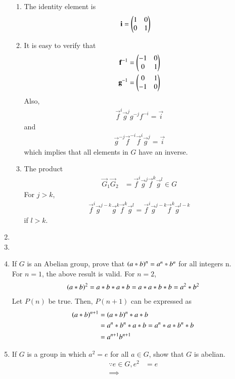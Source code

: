 \begin{enumerate}[label=\arabic*.,ref=\thesubsection.\theenumi]
\begin{enumerate}
	\item The identity element is 
\begin{align}
	\mathbf{i} &= 	\begin{pmatrix}1 & 0\\0 & 1\end{pmatrix}
\end{align}
	\item It is easy to verify that 
\begin{align}
	\mathbf{f}^{-1} &= 	\begin{pmatrix}-1 & 0\\0 & 1\end{pmatrix}
		\\
	\mathbf{g}^{-1} &= 
	\begin{pmatrix}0  & 1\\-1 & 0\end{pmatrix}
\end{align}
Also, 
\begin{align}
	\vec{f}^{i}
	\vec{g}^{j}g^{-j}f^{-i} =\vec{i} 
\end{align}
and 
\begin{align}
	\vec{g}^{-j}\vec{f}^{-i}	\vec{f}^{i}
	\vec{g}^{j} =\vec{i} 
\end{align}
which implies that all elements in $G$ have an inverse.
	\item The product
\begin{align}
	\vec{G}_1 	\vec{G}_2&= \vec{f}^i\vec{g}^j 
  \vec{f}^k\vec{g}^l \in G
\end{align}
For $j > k$,
\begin{align}
	\vec{f}^i\vec{g}^{j-k} \vec{g}^{k}
  \vec{f}^k\vec{g}^l  = 
	\vec{f}^i\vec{g}^{j-k} \vec{f}^{k}
	\vec{g}^{l-k}
\end{align}
if $l > k$.
\end{enumerate}
\item 
\item 
\item If $G$ is an Abelian group, prove that $\left(a*b\right)^n = a^n * b^n$ for all integers n.
	\\
	\solution For $n = 1$, the above result is valid.  For $n = 2$, 
\begin{align}
	\left(a*b\right)^2 = a*b*a*b = a*a*b*b = a^2*b^2
\end{align}
Let $P(n)$ be true.  Then, $P(n+1)$ can be expressed as 
\begin{align}
	\left(a*b\right)^{n+1} &= \left(a*b\right)^{n}*a*b 
	\\
	&= a^n*b^n*a*b = a^n*a*b^n*b 
	\\
	&= a^{n+1}b^{n+1}
\end{align}
\item If $G$ is a group in which $a^2 = e$ for all $a \in G$, show that $G$ is abelian.
	\\
	\solution 
\begin{align}
	\because e \in G, e^2 &= e	
	\\
	\implies 
\end{align}
\end{enumerate}
